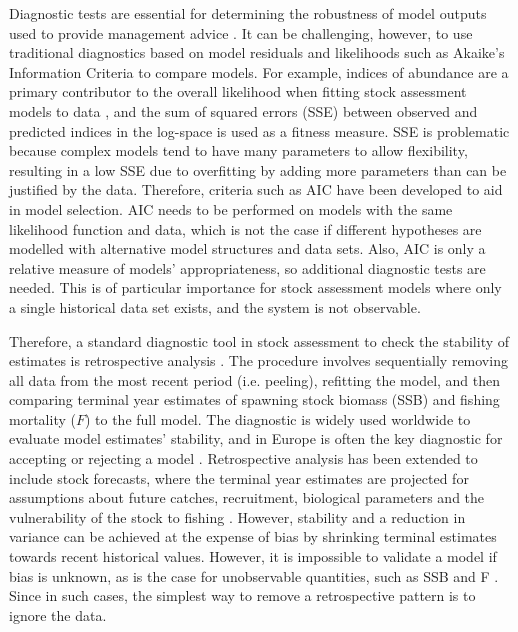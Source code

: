 \documentclass[11pt,a4paper]{article}
\begin{document}
{Diagnostic tests are essential for determining the robustness of model outputs used to provide management advice \citep{carvalho2020cookbook}. It can be challenging, however, to use traditional diagnostics based on model residuals and likelihoods such as Akaike’s Information Criteria  \citep[AIC,][]{akaike1998information} to compare models. For example, indices of abundance are a primary contributor to the overall likelihood when fitting stock assessment models to data \citep{whitten2013accounting}, and the sum of squared errors (SSE) between observed and predicted indices in the log-space is used as a fitness measure. SSE is problematic because complex models tend to have many parameters to allow flexibility, resulting in a low SSE due to overfitting by adding more parameters than can be justified by the data. Therefore, criteria such as AIC have been developed to aid in model selection. AIC needs to be performed on models with the same likelihood function and data, which is not the case if different hypotheses are modelled with alternative model structures and data sets. Also, AIC is only a relative measure of models' appropriateness, so additional diagnostic tests are needed. This is of particular importance for stock assessment models where only a single historical data set exists, and the system is not observable. 

Therefore, a standard diagnostic tool in stock assessment to check the stability of estimates is retrospective analysis \citep{hurtado2014looking}. The procedure involves sequentially removing all data from the most recent period (i.e. peeling),  refitting the model, and then comparing terminal year estimates of spawning stock biomass (SSB) and fishing mortality ($F$) to the full model. The diagnostic is widely used worldwide to evaluate model estimates' stability, and in Europe is often the key diagnostic for accepting or rejecting a model \citep{ICES2019}. Retrospective analysis has been extended to include stock forecasts, where the terminal year estimates are projected for assumptions about future catches, recruitment, biological parameters and the vulnerability of the stock to fishing \citep[e.g.][]{brooks2016retrospective}. However, stability and a reduction in variance can be achieved at the expense of bias by shrinking terminal estimates towards recent historical values. However, it is impossible to validate a model if bias is unknown, as is the case for unobservable quantities, such as SSB and F \citep{hodges1992you}. Since in such cases, the simplest way to remove a retrospective pattern is to ignore the data. 

}
\end{document}
